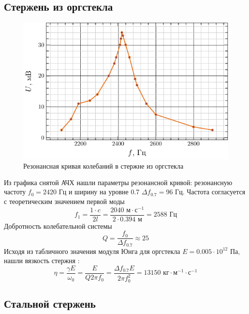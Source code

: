 \documentclass[a4paper,14pt]{extarticle}
\begin{document}
\subsection{Стержень из оргстекла}

\begin{figure}[H]
	\centering
	\includegraphics[scale=1.5]{fig/glass_afc}
	\caption{Резонансная кривая колебаний в стержне из оргстекла}
	\label{fig:chem1}
\end{figure}

Из графика снятой АЧХ нашли параметры резонансной кривой: резонансную частоту
$f_0=2420\text{ Гц}$ и ширину на уровне 0.7 $\Delta f_{0.7} = 96\text{ Гц}$. 
Частота согласуется с теоретическим значением первой моды
\begin{equation}
	f_1 = \frac{1\cdot c}{2l} = \frac{2040 \text{ м}\cdot\text{с}^{-1}}{2\cdot 0.394\text{ м}}=2588 \text{ Гц}
\end{equation}
Добротность колебательной системы
\begin{equation}
	Q = \frac{f_0}{\Delta f_{0.7}} \approx 25
\end{equation}
Исходя из табличного значения модуля Юнга для оргстекла $E=0.005\cdot10^{12}$ Па, нашли вязкость стержня  \cite[стр. 10]{met}:
\begin{equation}
	\eta = \frac{\gamma E}{\omega_0}= \frac{ E}{Q 2\pi f_0} = \frac{\Delta f_{0.7} E}{2\pi f_0^2} = 13150 \text{ кг}\cdot\text{м}^{-1}\cdot\text{с}^{-1}
\end{equation}


\subsection{Стальной стержень}
\end{document}
